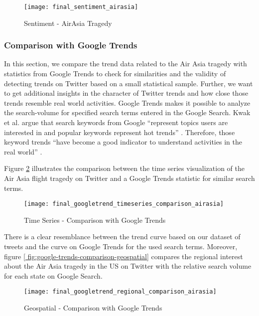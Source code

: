 \begin{figure}[H]
  \centering
        \texttt{[image: final\_sentiment\_airasia]}
  \caption[Sentiment - AirAsia Tragedy]{Sentiment - AirAsia Tragedy}
  \label{fig:air-asia-sentiment}
  \vspace{-1.3em}
\end{figure}

\subsubsection{Comparison with Google Trends}
In this section, we compare the trend data related to the Air Asia tragedy with statistics from Google Trends to check for similarities and the validity of detecting trends on Twitter based on a small statistical sample. Further, we want to get additional insights in the character of Twitter trends and how close those trends resemble real world activities. Google Trends makes it possible to analyze the search-volume for specified search terms entered in the Google Search. Kwak et al. argue that search keywords from Google \enquote{represent topics users are interested in and popular keywords represent hot trends} \cite[6]{kwak2010what}. Therefore, those keyword trends \enquote{have become a good indicator to understand activities in the real world} \cite[6]{kwak2010what}.

Figure \ref{fig:google-trends-comparison-timeseries} illustrates the comparison between the time series visualization of the Air Asia flight tragedy on Twitter and a Google Trends statistic for similar search terms. 

\begin{figure}[H]
  \centering
        \texttt{[image: final\_googletrend\_timeseries\_comparison\_airasia]}
  \caption[Time Series - Comparison with Google Trends]{Time Series - Comparison with Google Trends}
  \label{fig:google-trends-comparison-timeseries}
  \vspace{-1.3em}
\end{figure}

There is a clear resemblance between the trend curve based on our dataset of tweets and the curve on Google Trends for the used search terms. Moreover, figure \ref{ fig:google-trends-comparison-geospatial} compares the regional interest about the Air Asia tragedy in the US on Twitter with the relative search volume for each state on Google Search. 

\begin{figure}[H]
  \centering
        \texttt{[image: final\_googletrend\_regional\_comparison\_airasia]}
  \caption[Geospatial - Comparison with Google Trends]{Geospatial - Comparison with Google Trends}
  \label{fig:google-trends-comparison-geospatial}
  \vspace{-1.3em}
\end{figure}


